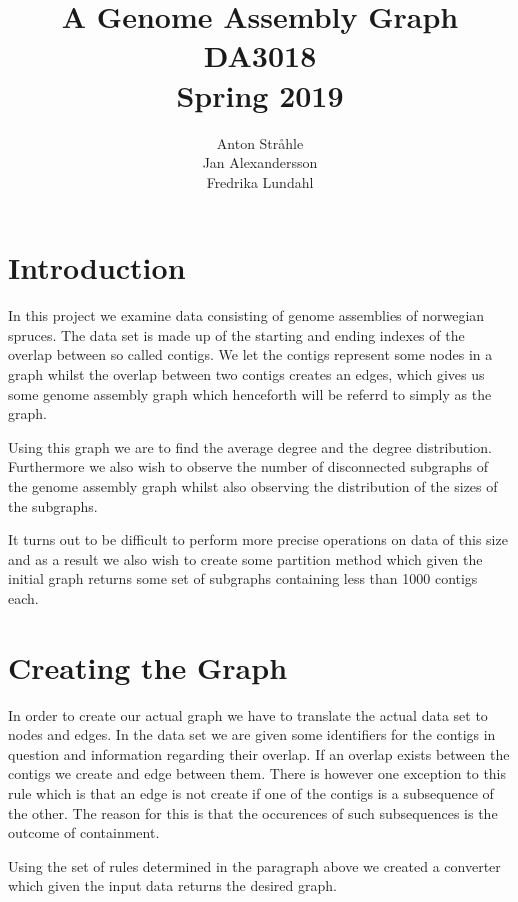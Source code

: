 \documentclass[a4paper,10pt]{article}
\title{A Genome Assembly Graph \\
    \smallskip
    \large{DA3018} \\
    \smallskip
    \large{Spring 2019}}
\author{Anton Stråhle \\ 
    Jan Alexandersson \\
    Fredrika Lundahl}
\date{}
\begin{document}
\maketitle

\section{Introduction}

In this project we examine data consisting of genome assemblies of norwegian spruces. The data set is made up of the starting and ending indexes of the overlap between so called contigs. We let the contigs represent some nodes in a graph whilst the overlap between two contigs creates an edges, which gives us some genome assembly graph which henceforth will be referrd to simply as the graph. 

\medskip

Using this graph we are to find the average degree and the degree distribution. Furthermore we also wish to observe the number of disconnected subgraphs of the genome assembly graph whilst also observing the distribution of the sizes of the subgraphs. 

\medskip

It turns out to be difficult to perform more precise operations on data of this size and as a result we also wish to create some partition method which given the initial graph returns some set of subgraphs containing less than 1000 contigs each. 

\section{Creating the Graph}

In order to create our actual graph we have to translate the actual data set to nodes and edges. In the data set we are given some identifiers for the contigs in question and information regarding their overlap. If an overlap exists between the contigs we create and edge between them. There is however one exception to this rule which is that an edge is not create if one of the contigs is a subsequence of the other. The reason for this is that the occurences of such subsequences is the outcome of containment.

\medskip

Using the set of rules determined in the paragraph above we created a converter which given the input data returns the desired graph. 

\medskip
\end{document}
